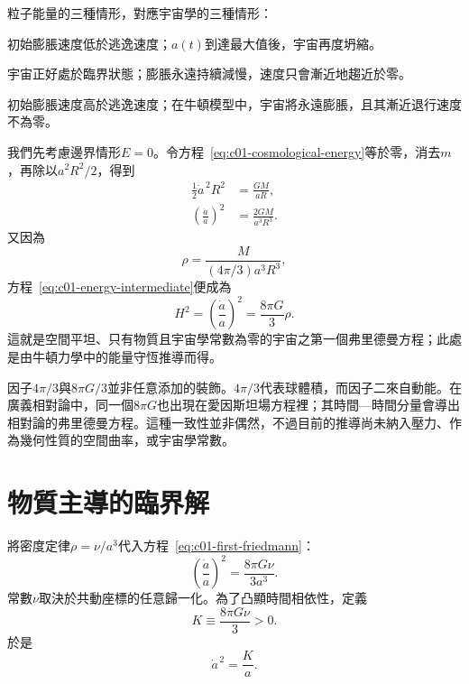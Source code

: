 粒子能量的三種情形，對應宇宙學的三種情形：
\begin{description}[style=nextline]
\item[\(E<0\)：]初始膨脹速度低於逃逸速度；\(a(t)\)到達最大值後，宇宙再度坍縮。
\item[\(E=0\)：]宇宙正好處於臨界狀態；膨脹永遠持續減慢，速度只會漸近地趨近於零。
\item[\(E>0\)：]初始膨脹速度高於逃逸速度；在牛頓模型中，宇宙將永遠膨脹，且其漸近退行速度不為零。
\end{description}

我們先考慮邊界情形\(E=0\)。令方程~\eqref{eq:c01-cosmological-energy}等於零，消去\(m\)，再除以\(a^2R^2/2\)，得到
\begin{align}
\frac12\dot a^{\,2}R^2&=\frac{GM}{aR}, \\
\left(\frac{\dot a}{a}\right)^2&=\frac{2GM}{a^3R^3}.
\label{eq:c01-energy-intermediate}
\end{align}
又因為
\begin{equation}
\rho=\frac{M}{(4\pi/3)a^3R^3},
\end{equation}
方程~\eqref{eq:c01-energy-intermediate}便成為
\begin{equation}
\boxed{
H^2=\left(\frac{\dot a}{a}\right)^2=\frac{8\pi G}{3}\rho.
}
\label{eq:c01-first-friedmann}
\end{equation}
這就是空間平坦、只有物質且宇宙學常數為零的宇宙之第一個弗里德曼方程；此處是由牛頓力學中的能量守恆推導而得。

\begin{classroomqa}
\end{classroomqa}

因子\(4\pi/3\)與\(8\pi G/3\)並非任意添加的裝飾。\(4\pi/3\)代表球體積，而因子二來自動能。在廣義相對論中，同一個\(8\pi G\)也出現在愛因斯坦場方程裡；其時間—時間分量會導出相對論的弗里德曼方程。這種一致性並非偶然，不過目前的推導尚未納入壓力、作為幾何性質的空間曲率，或宇宙學常數。

\section{物質主導的臨界解}

將密度定律\(\rho=\nu/a^3\)代入方程~\eqref{eq:c01-first-friedmann}：
\begin{equation}
\left(\frac{\dot a}{a}\right)^2=\frac{8\pi G\nu}{3a^3}.
\label{eq:c01-matter-friedmann}
\end{equation}
常數\(\nu\)取決於共動座標的任意歸一化。為了凸顯時間相依性，定義
\begin{equation}
K\equiv\frac{8\pi G\nu}{3}>0.
\end{equation}
於是
\begin{equation}
\dot a^{\,2}=\frac{K}{a}.
\label{eq:c01-normalized-friedmann}
\end{equation}

